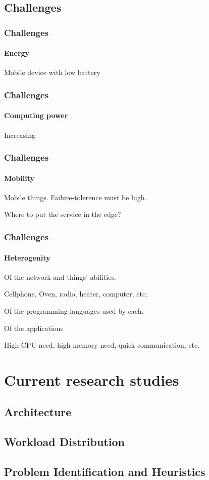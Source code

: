 \documentclass[utf8,xcolor=table, page number]{earlywinter}
\begin{document}
\subsection{Challenges}
\begin{frame}
  \frametitle{Challenges}
  \framesubtitle{Energy}
  
  Mobile device with low battery
  
\end{frame}
\begin{frame}
  \frametitle{Challenges}
  \framesubtitle{Computing power}
  
  Increasing
  
\end{frame}
\begin{frame}
  \frametitle{Challenges}
  \framesubtitle{Mobility}
  
  Mobile things. Failure-tolerence must be high.
  
  Where to put the service in the edge?
  
\end{frame}
\begin{frame}
  \frametitle{Challenges}
  \framesubtitle{Heterogenity}
  
  Of the network and things' abilities.
  
	\begin{example}
		Cellphone, Oven, radio, heater, computer, etc.
	\end{example}
  
  Of the programming languages used by each.  
  
  Of the applications
	\begin{example}
		High CPU need, high memory need, quick communication, etc.
	\end{example}
  
\end{frame}

\section{Current research studies}
\subsection{Architecture}
\subsection{Workload Distribution}
\subsection{Problem Identification and Heuristics}
\end{document}
